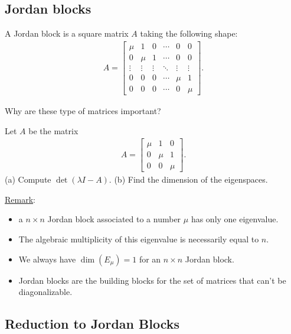 \documentclass[12pt,a4paper]{article}
\newcounter{example}[section]
\begin{document}
	\subsection{Jordan blocks}
	A Jordan block is a square matrix $A$ taking the following shape:
		\begin{align*}
		A = \begin{bmatrix}
		\mu & 1 & 0 & \cdots & 0 & 0\\
		0 & \mu & 1 & \cdots & 0 & 0\\
		\vdots & \vdots & \vdots & \ddots & \vdots & \vdots \\
		0 & 0 & 0 & \cdots & \mu & 1 \\
		0 & 0 & 0 & \cdots & 0 & \mu
		\end{bmatrix} .
		\end{align*}
		
	Why are these type of matrices important?
		
	\begin{example}
	Let $A$ be the matrix
		\begin{align*}
		A = \begin{bmatrix}
		\mu & 1 & 0 \\
		0 & \mu & 1 \\
		0 & 0 & \mu
		\end{bmatrix}.
		\end{align*}
	(a) Compute $\det (\lambda I - A)$. (b) Find the dimension of the eigenspaces.
	\end{example}
	
	\vfill
	
	\underline{Remark}: 
	\begin{itemize}
	\item a $n \times n$ Jordan block associated to a number $\mu$ has only one eigenvalue.
	\item The algebraic multiplicity of this eigenvalue is necessarily equal to $n$.
	\item We always have $\dim (E_{\mu}) = 1$ for an $n \times n$ Jordan block.
	\item Jordan blocks are the building blocks for the set of matrices that can't be diagonalizable.
	\end{itemize}
	
	\newpage
	
	\subsection{Reduction to Jordan Blocks}
	
\end{document}
